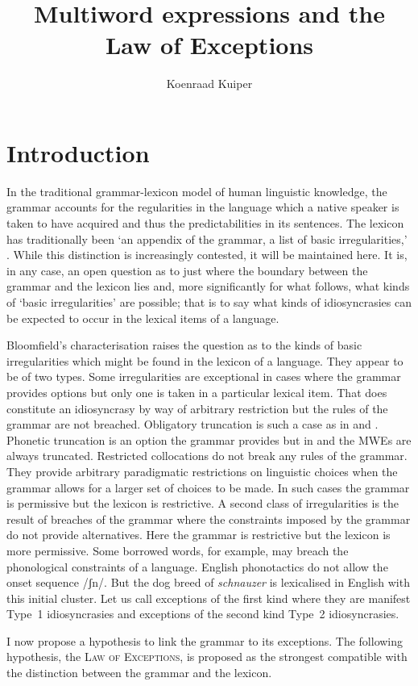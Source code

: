 \documentclass[output=paper]{langsci/langscibook}
\author{Koenraad Kuiper\affiliation{University of Canterbury, New Zealand}}
\title{Multiword expressions and the Law of Exceptions}
\begin{document}
\section{Introduction}

In the traditional grammar-lexicon model of human linguistic knowledge, the grammar accounts for the regularities in the language which a native speaker is taken to have acquired and thus the predictabilities in its sentences. The lexicon has traditionally been ‘an appendix of the grammar, a list of basic irregularities,’ \citep[274]{Bloomfield1933}. While this distinction is increasingly contested, it will be maintained here. It is, in any case, an open question as to just where the boundary between the grammar and the lexicon lies and, more significantly for what follows, what kinds of ‘basic irregularities’ are possible; that is to say what kinds of idiosyncrasies can be expected to occur in the lexical items of a language. 

Bloomfield’s characterisation raises the question as to the kinds of basic irregularities which might be found in the lexicon of a language. They appear to be of two types. Some irregularities are exceptional in cases where the grammar provides options but only one is taken in a particular lexical item. That does constitute an idiosyncrasy by way of arbitrary restriction but the rules of the grammar are not breached. Obligatory truncation  is such a case as in  and . Phonetic truncation is an option the grammar provides but in  and  the MWEs are always truncated. Restricted collocations do not break any rules of the grammar. They provide arbitrary paradigmatic restrictions on linguistic choices when the grammar allows for a larger set of choices to be made. In such cases the grammar is permissive but the lexicon is restrictive. A second class of irregularities is the result of breaches of the grammar where the constraints imposed by the grammar do not provide alternatives. Here the grammar is restrictive but the lexicon is more permissive. Some borrowed words, for example, may breach the phonological constraints of a language.  English  phonotactics do not allow the onset sequence /ʃn/. But the dog breed of \textit{schnauzer} is lexicalised in English with this initial cluster. Let us call exceptions of the first kind where they are manifest Type~1 idiosyncrasies and exceptions of the second kind Type~2 idiosyncrasies.

I now propose a hypothesis to link the grammar to its exceptions. The following hypothesis,  the 
\textsc{Law of Exceptions}, is proposed as the strongest compatible with the distinction between 
the grammar and the lexicon.
\end{document}
